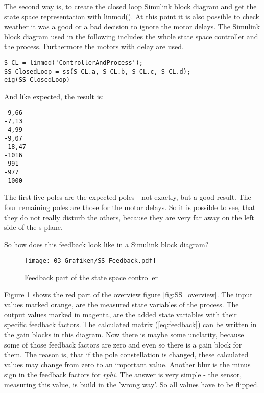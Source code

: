 The second way is, to create the closed loop Simulink block diagram and get the state space representation with linmod(). At this point it is also possible to check weather it was a good or a bad decision to ignore the motor delays. The Simulink block diagram used in the following includes the whole state space controller and the process. Furthermore the motors with delay are used.

\begin{lstlisting}
S_CL = linmod('ControllerAndProcess');
SS_ClosedLoop = ss(S_CL.a, S_CL.b, S_CL.c, S_CL.d);
eig(SS_ClosedLoop)
\end{lstlisting}

And like expected, the result is:

\begin{lstlisting}
-9,66
-7,13
-4,99
-9,07
-18,47
-1016
-991
-977
-1000
\end{lstlisting}

The first five poles are the expected poles - not exactly, but a good result. The four remaining poles are those for the motor delays. So it is possible to see, that they do not really disturb the others, because they are very far away on the left side of the s-plane.


So how does this feedback look like in a Simulink block diagram? 

\begin{figure}
	\centering
		\texttt{[image: 03\_Grafiken/SS\_Feedback.pdf]}
	\caption{Feedback part of the state space controller}
	\label{fig:SS_Feedback}
\end{figure}

Figure \ref{fig:SS_Feedback} shows the red part of the overview figure \ref{fig:SS_overview}. The input values marked orange, are the measured state variables of the process. The output values marked in magenta, are the added state variables with their specific feedback factors. The calculated matrix (\ref{eq:feedback}) can be written in the gain blocks in this diagram. Now there is maybe some unclarity, because some of those feedback factors are zero and even so there is a gain block for them. The reason is, that if the pole constellation is changed, these calculated values may change from zero to an important value. Another blur is the minus sign in the feedback factors for \textit{rphi}. The answer is very simple - the sensor, measuring this value, is build in the 'wrong way'. So all values have to be flipped.